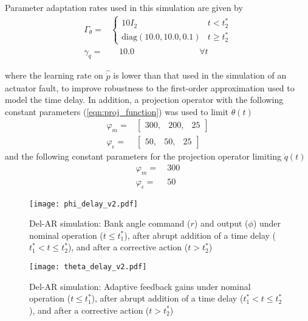 \noindent Parameter adaptation rates used in this simulation are given by
\begin{align}
	\Gamma_\theta  = & \begin{cases}
		10 I_2 & t < t_2^*\\
		\text{diag}(10.0, 10.0, 0.1) & t \geq t_2^*
 	\end{cases} \\
	\gamma_q  = &\quad 10.0 \qquad ~ \qquad ~ \qquad ~ \quad \forall t
\end{align}

\noindent where the learning rate on $\hat{\dot{p}}$ is lower than that used in the simulation of an actuator fault, to improve robustness to the first-order approximation used to model the time delay. In addition, a projection operator with the following constant parameters (\ref{eqn:proj_function}) was used to limit $\dot{\theta}(t)$
\begin{align}
	\varphi_m = & \begin{bmatrix}
		300, & 200, & 25
	\end{bmatrix} \\
	\varphi_{\epsilon} = & \begin{bmatrix}
		50, & 50, & 25
	\end{bmatrix}\end{align}
\noindent and the following constant parameters for the projection operator limiting $\dot{q}(t)$
\begin{align}
	\varphi_m = &~ 300\\
	\varphi_{\epsilon} = &~ 50
\end{align}

\begin{figure}[h!]
	\centering
	\texttt{[image: phi\_delay\_v2.pdf]}
	\caption{Del-AR simulation: Bank angle command ($r$) and output ($\phi$) under nominal operation ($t \leq t_1^*$), after abrupt addition of a time delay ($t_1^* < t \leq t_2^*$), and after a corrective action ($t > t_2^*$)}
	\label{fig:command_and_output_d}
\end{figure}

\begin{figure}[h!]
	\centering
	\texttt{[image: theta\_delay\_v2.pdf]}
	\caption{Del-AR simulation: Adaptive feedback gains under nominal operation ($t \leq t_1^*$), after abrupt addition of a time delay ($t_1^* < t \leq t_2^*$), and after a corrective action ($t > t_2^*$)}
	\label{fig:theta_d}
\end{figure}

